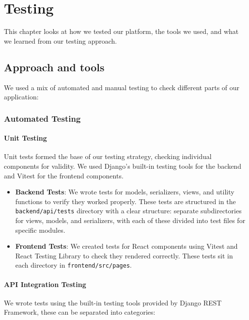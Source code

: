 \chapter{Testing}
\label{chap:testing}

This chapter looks at how we tested our platform, the tools we used, and what we learned from our testing approach.

\section{Approach and tools}
\label{sect:testing:approach}

We used a mix of automated and manual testing to check different parts of our application:

\subsection{Automated Testing}

\subsubsection{Unit Testing}
Unit tests formed the base of our testing strategy, checking individual components for validity. We used Django's built-in testing tools for the backend and Vitest for the frontend components.

\begin{itemize}
    \item \textbf{Backend Tests}: We wrote tests for models, serializers, views, and utility functions to verify they worked properly. These tests are structured in the \texttt{backend/api/tests} directory with a clear structure: separate subdirectories for views, models, and serializers, with each of these divided into test files for specific modules.
    
    \item \textbf{Frontend Tests}: We created tests for React components using Vitest and React Testing Library to check they rendered correctly. These tests sit in each directory in \texttt{frontend/src/pages}.
\end{itemize}

\subsubsection{API Integration Testing}
We wrote tests using the built-in testing tools provided by Django REST Framework, these can be separated into categories:

